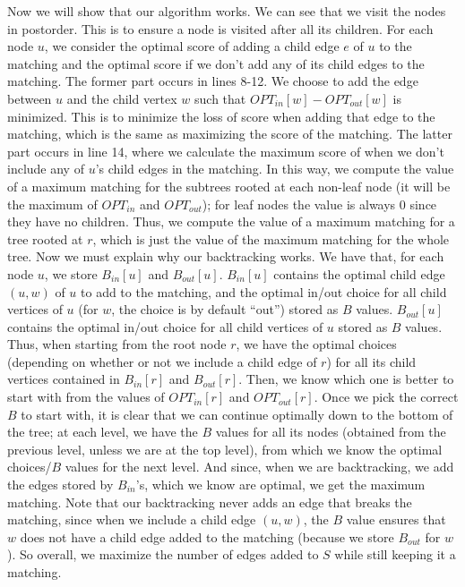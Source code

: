 \documentclass{article}
\begin{document}
Now we will show that our algorithm works. We can see that we visit the nodes in
postorder. This is to ensure a node is visited after all its children. For each
node $u$, we consider the optimal score of adding a child edge $e$ of $u$
to the matching and the optimal score if we don't add any of its child
edges to the matching. The former part occurs in lines 8-12. We choose to add
the edge between $u$ and the child vertex $w$ such that $OPT_{in}[w] -
OPT_{out}[w]$ is minimized.
This is to minimize the loss of score when adding that edge to the
matching, which is the same as maximizing the score of the matching.
The latter part occurs in line 14, where we calculate the maximum score of when
we don't include any of $u$'s child edges in the matching. In this way, we
compute the value of a maximum matching for the subtrees rooted at each non-leaf
node (it will be the maximum of $OPT_{in}$ and $OPT_{out}$); for leaf nodes the
value is always $0$ since they have no children.
Thus, we compute the value of a maximum matching for a tree rooted at $r$, which
is just the value of the maximum matching for the whole tree. Now we must
explain why our backtracking works. We have that, for each node $u$, we store
$B_{in}[u]$ and $B_{out}[u]$. $B_{in}[u]$ contains the optimal child edge
$(u,w)$ of $u$ to add to the matching, and the optimal in/out choice for all child vertices of
$u$ (for $w$, the choice is by default ``out'') stored as $B$ values. $B_{out}[u]$ contains the
optimal in/out choice for all child vertices of $u$ stored as $B$ values. Thus, when starting from the
root node $r$, we have the optimal choices (depending on whether or not we
include a child edge of $r$) for all its child vertices contained
in $B_{in}[r]$ and $B_{out}[r]$. Then, we know which one is better to start with from the values
of $OPT_{in}[r]$ and $OPT_{out}[r]$. Once we pick the correct $B$ to start with,
it is clear that we can continue optimally down to the bottom of the
tree; at each level, we have the $B$ values for all its nodes
(obtained from the previous level, unless we are at the top level),
from which we know the optimal choices/$B$
values for the next level. And since, when we are backtracking, we add the edges
stored by $B_{in}$'s, which we know are optimal, we get the maximum matching.
Note that our backtracking never adds an edge that breaks the matching, since
when we include a child edge $(u,w)$, the $B$ value ensures that $w$ does not
have a child edge added to the matching (because we store $B_{out}$ for $w$).
So overall, we maximize the number of edges added to $S$ while still keeping it
a matching.
\newpage
\end{document}
